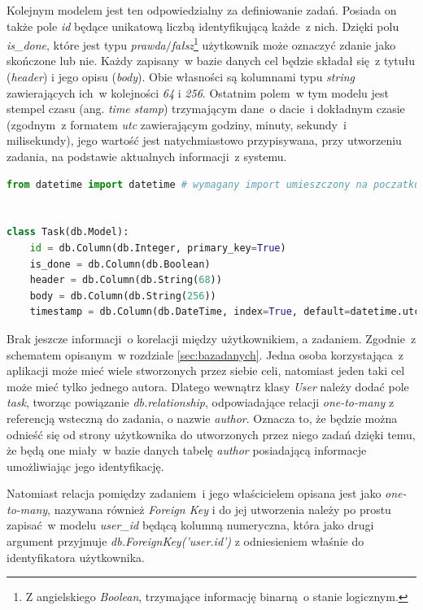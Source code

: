 Kolejnym modelem jest ten odpowiedzialny za definiowanie zadań. Posiada on także pole \textit{id} będące unikatową liczbą identyfikującą każde~z nich. Dzięki polu \textit{is\_done}, które jest typu \textit{prawda$/$fałsz}\footnote{Z angielskiego \textit{Boolean}, trzymające informację binarną~o stanie logicznym\cite{flasksql}.} użytkownik może oznaczyć zdanie jako skończone lub nie. Każdy zapisany~w bazie danych cel będzie składał się~z tytułu (\textit{header}) i jego opisu (\textit{body}). Obie własności są kolumnami typu \textit{string} zawierających ich~w kolejności \textit{64} i \textit{256}. Ostatnim polem~w tym modelu jest stempel czasu (ang. \textit{time stamp}) trzymającym dane~o dacie~i dokładnym czasie (zgodnym~z formatem \textit{utc}\cite{python} zawierającym godziny, minuty, sekundy~i milisekundy), jego wartość jest natychmiastowo przypisywana, przy utworzeniu zadania, na podstawie aktualnych informacji~z systemu\cite{python}.

\begin{lstlisting}[language=Python, caption={Klasa odpowiedzialna za model zadania.}]
from datetime import datetime # wymagany import umieszczony na poczatku pliku


class Task(db.Model):
    id = db.Column(db.Integer, primary_key=True)
    is_done = db.Column(db.Boolean)
    header = db.Column(db.String(68))
    body = db.Column(db.String(256))
    timestamp = db.Column(db.DateTime, index=True, default=datetime.utcnow)
\end{lstlisting}

Brak jeszcze informacji~o korelacji między użytkownikiem, a zadaniem. Zgodnie~z schematem opisanym~w rozdziale \ref{sec:bazadanych}. Jedna osoba korzystająca~z aplikacji może mieć wiele stworzonych przez siebie celi, natomiast jeden taki cel może mieć tylko jednego autora. Dlatego wewnątrz klasy \textit{User} należy dodać pole \textit{task}, tworząc powiązanie \textit{db.relationship}, odpowiadające relacji \textit{one-to-many}\cite{flasksql} z referencją wsteczną do zadania, o nazwie \textit{author}. Oznacza to, że będzie można odnieść się od strony użytkownika do utworzonych przez niego zadań dzięki temu, że będą one miały~w bazie danych tabelę \textit{author} posiadającą informacje umożliwiając jego identyfikację.

Natomiast relacja pomiędzy zadaniem~i jego właścicielem opisana jest jako \textit{one-to-many}, nazywana również \textit{Foreign Key}\cite{Ziade:2018, flasksql} i do jej utworzenia należy po prostu zapisać~w modelu \textit{user\_id} będącą kolumną numeryczna, która jako drugi argument przyjmuje \textit{db.ForeignKey('user.id')} z odniesieniem właśnie do identyfikatora użytkownika.

